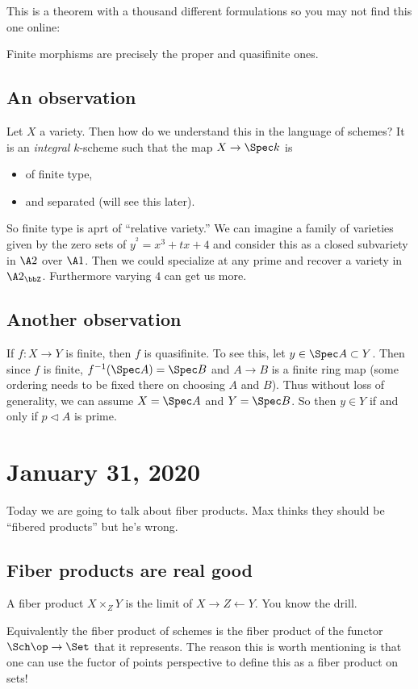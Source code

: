 \documentclass[12pt]{article}
\begin{document}
This is a theorem with a thousand different formulations so you may not find this one online:
\begin{thm}
	Finite morphisms are precisely the proper and quasifinite ones.
\end{thm}

\subsection{An observation}
Let $X$ a variety. Then how do we understand this in the language of schemes? It is an \textit{integral} $k$-scheme such that the map 
$X\to \Spec k$ is
\begin{itemize}
	\item of finite type,
	\item and separated (will see this later).
\end{itemize}
So finite type is aprt of ``relative variety.'' We can imagine a family of varieties given by the zero sets 
of $y^^2=x^3+tx+4$ and consider this as a closed subvariety in $\A 2$ over $\A1$. Then we could specialize at any prime and recover a variety in $\A2_\bbZ$.
Furthermore varying $4$ can get us more.

\subsection{Another observation}
If $f:X\to Y$ is finite, then $f$ is quasifinite. To see this, let $y\in \Spec A\subset Y$. Then since $f$ is finite,
$f^{-1}(\Spec A)=\Spec B$ and $A\to B$ is a finite ring map (some ordering needs to be fixed there on choosing $A$ and $B$).
Thus without loss of generality, we can assume $X=\Spec A$ and $Y=\Spec B$. So then $y\in Y$ if and only if $p\lhd A$ is prime.

\section{January 31, 2020}
Today we are going to talk about fiber products. Max thinks they should be ``fibered products'' but he's wrong.

\subsection{Fiber products are real good}
\begin{defn}
	A fiber product $X\times_Z Y$ is the limit of $X\to Z\leftarrow Y$.
	You know the drill.
\end{defn}
Equivalently the fiber product of schemes is the fiber product of the functor $\Sch\op\to \Set$ that it represents.
The reason this is worth mentioning is that one can use the fuctor of points perspective to define this as a fiber product 
on sets! 
\end{document}
